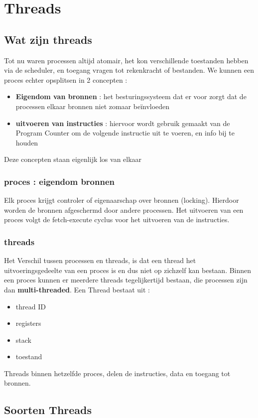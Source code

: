 \documentclass{report}
\begin{document}
   	\chapter{Threads}
   		\section{Wat zijn threads}
   			Tot nu waren processen altijd atomair, het kon verschillende toestanden hebben via de scheduler, en toegang vragen tot rekenkracht of bestanden. We kunnen een proces echter opsplitsen in 2 concepten : 
   			\begin{itemize}
   				\item \textbf{Eigendom van bronnen} : het besturingssysteem dat er voor zorgt dat de processen elkaar bronnen niet zomaar beïnvloeden
   				\item \textbf{uitvoeren van instructies} : hiervoor wordt gebruik gemaakt van de Program Counter om de volgende instructie uit te voeren, en info bij te houden
   			\end{itemize}
   			Deze concepten staan eigenlijk los van elkaar
   			\subsection{proces : eigendom bronnen}
   				Elk proces krijgt controler of eigenaarschap over bronnen (locking). Hierdoor worden de bronnen afgeschermd door andere processen. Het uitvoeren van een proces volgt de fetch-execute cyclus voor het uitvoeren van de instructies.\\
   			\subsection{ threads}
   				Het Verschil tussen processen en threads, is dat een thread het uitvoeringsgedeelte van een proces is en dus niet op zichzelf kan bestaan. Binnen een proces kunnen er meerdere threads tegelijkertijd bestaan, die processen zijn dan \textbf{multi-threaded}. Een Thread bestaat uit : 
   				\begin{itemize}
   					\item thread ID
   					\item registers
   					\item stack 
   					\item toestand
   				\end{itemize}
				Threads binnen hetzelfde proces, delen de instructies, data en toegang tot bronnen. 
		\section{Soorten Threads}
\end{document}
